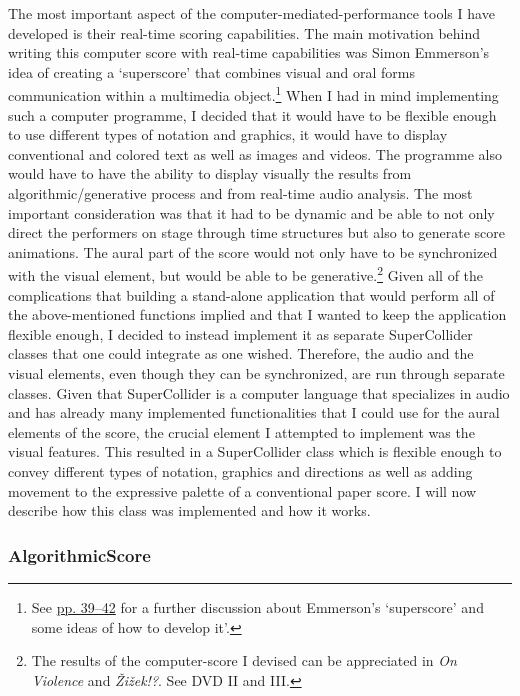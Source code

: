 The most important aspect of the computer-mediated-performance tools I have developed is their real-time scoring capabilities. The main motivation behind writing this computer score with real-time capabilities was Simon Emmerson's idea of creating a `superscore' that combines visual and oral forms communication within a multimedia object.\footnote{See \hyperlink{superscore}{pp. 39--42} for a further discussion about Emmerson's `superscore' and some ideas of how to develop it'.} When I had in mind implementing such a computer programme, I decided that it would have to be flexible enough to use different types of notation and graphics, it would have to display conventional and colored text as well as images and videos. The programme also would have to have the ability to display visually the results from algorithmic/generative process and from real-time audio analysis. The most important consideration was that it had to be dynamic and be able to not only direct the performers on stage through time structures but also to generate score animations. The aural part of the score would not only have to be synchronized with the visual element, but would be able to be generative.\footnote{The results of the computer-score I devised can be appreciated in \emph{On Violence} and \emph{\v{Z}i\v{z}ek!?}. See DVD II and III.} Given all of the complications that building a stand-alone application that would perform all of the above-mentioned functions implied and that I wanted to keep the application flexible enough, I decided to instead implement it as separate SuperCollider classes that one could integrate as one wished. Therefore, the audio and the visual elements, even though they can be synchronized, are run through separate classes. Given that SuperCollider is a computer language that specializes in audio and has already many implemented functionalities that I could use for the aural elements of the score, the crucial element I attempted to implement was the visual features. This resulted in a SuperCollider class which is flexible enough to convey different types of notation, graphics and directions as well as adding movement to the expressive palette of a conventional paper score. I will now describe how this class was implemented and how it works.

\hypertarget{algoscore}{}
\subsubsection{AlgorithmicScore}

